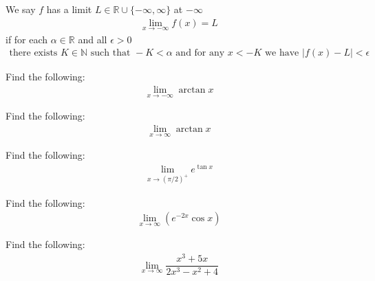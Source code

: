 \begin{definition}
We say $f$ has a limit $L \in \mathbb{R} \cup \{-\infty, \infty\}$ at $-\infty$ 
\begin{align*}
    \lim_{x \longrightarrow -\infty} f(x) = L
\end{align*}
if for each $\alpha \in \mathbb{R}$ and all $\epsilon > 0$ 
\begin{align*}
    \text{there exists} \hspace{4pt} K \in \mathbb{N} \hspace{4pt} \text{such that} \hspace{4pt} -K < \alpha \hspace{4pt} \text{and for any} \hspace{4pt} x < -K \hspace{4pt} \text{we have} \hspace{4pt} \lvert f(x) - L \rvert < \epsilon
\end{align*}
\end{definition}

\begin{exercise}
Find the following:
\begin{align*}
    \lim_{x \longrightarrow -\infty} \arctan x
\end{align*}
\end{exercise}

\begin{exercise}
Find the following:
\begin{align*}
    \lim_{x \longrightarrow \infty} \arctan x
\end{align*}
\end{exercise}

\begin{exercise}
Find the following:
\begin{align*}
    \lim_{x \longrightarrow (\pi/2)^{+}} e^{\tan x}
\end{align*}
\end{exercise}

\begin{exercise}
Find the following:
\begin{align*}
    \lim_{x \longrightarrow \infty} (e^{-2x}\cos x)
\end{align*}
\end{exercise}

\begin{exercise}
Find the following:
\begin{align*}
    \lim_{x \longrightarrow \infty} \dfrac{x^{3} + 5x}{2x^{3} - x^{2} + 4}
\end{align*}
\end{exercise}

